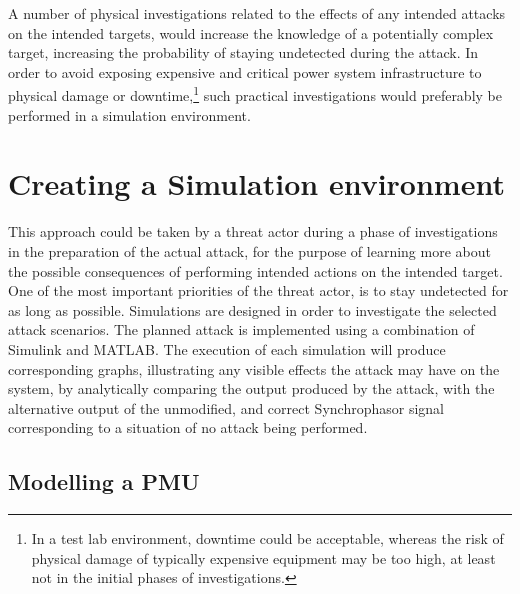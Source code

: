 






A number of physical investigations related to the effects of any intended attacks on the intended targets, would increase the knowledge of a potentially complex target, increasing the probability of staying undetected during the attack. In order to avoid exposing expensive and critical power system infrastructure to physical damage or downtime,\footnote{In a test lab environment, downtime could be acceptable, whereas the risk of physical damage of typically expensive equipment may be too high, at least not in the initial phases of investigations.} such practical investigations would preferably be performed in a simulation environment.

\section{Creating a Simulation environment}

This approach could be taken by a threat actor during a phase of investigations in the preparation of the actual attack, for the purpose of learning more about the possible consequences of performing intended actions on the intended target. One of the most important priorities of the threat actor, is to stay undetected for as long as possible. Simulations are designed in order to investigate the selected attack scenarios. The planned attack is implemented using a combination of Simulink and MATLAB. The execution of each simulation will produce corresponding graphs, illustrating any visible effects the attack may have on the system, by analytically comparing the output produced by the attack, with the alternative output of the unmodified, and correct Synchrophasor signal corresponding to  a situation of no attack being performed.

\subsection{Modelling a PMU}

